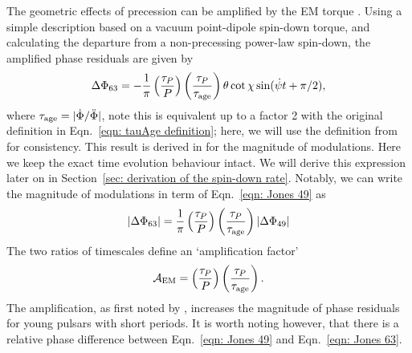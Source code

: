 \documentclass[../full_thesis/full_thesis.tex]{subfiles}
\begin{document}
The geometric effects of precession can be amplified by the EM torque \citep{Cordes1993}.
Using a simple description based on a vacuum point-dipole spin-down torque,
and calculating the departure from a non-precessing power-law spin-down,
the amplified phase residuals are given by
\begin{align}
\Delta\Phi_{63} = -\frac{1}{\pi}\left(\frac{\tau_{P}}{P}\right)
                               \left(\frac{\tau_{P}}{\tau_{\mathrm{age}}}\right)
                               \theta
                               \cot\chi
                               \sin(\dot{\psi} t + \pi/2),
\label{eqn: Jones 63}
\end{align}
where $\tau_{\mathrm{age}}=|\dot{\Phi}/\ddot{\Phi}|$, note this is equivalent up to a factor
2 with the original definition in Eqn.~\eqref{eqn: tauAge definition}; here,
we will use the definition from \citet{Jones2001} for consistency.
This result is derived in \citet{Jones2001} for the magnitude of modulations.
Here we keep the exact time evolution behaviour intact. We will derive this
expression later on in Section~\ref{sec: derivation of the spin-down rate}.
Notably, we can write the magnitude of modulations in term of Eqn.~\eqref{eqn:
Jones 49} as
\begin{equation}
    |\Delta\Phi_{63}| = \frac{1}{\pi}\left(\frac{\tau_{P}}{P}\right)
    \left(\frac{\tau_{P}}{\tau_{\mathrm{age}}}\right)
                                    |\Delta\Phi_{49}|
\label{eqn: Jones 63 mag}
\end{equation}
The two ratios of timescales define an `amplification factor'
\begin{equation}
    \mathcal{A}_{\mathrm{EM}} = \left(\frac{\tau_{P}}{P}\right)
                                \left(\frac{\tau_{P}}{\tau_{\mathrm{age}}}\right).
\label{eqn: EM amplification}
\end{equation}
The amplification, as first noted by \citet{Cordes1993}, increases the
magnitude of phase residuals for young pulsars with short periods. It is worth
noting however, that there is a relative phase difference between
Eqn.~\eqref{eqn: Jones 49} and Eqn.~\eqref{eqn: Jones 63}.
\end{document}
